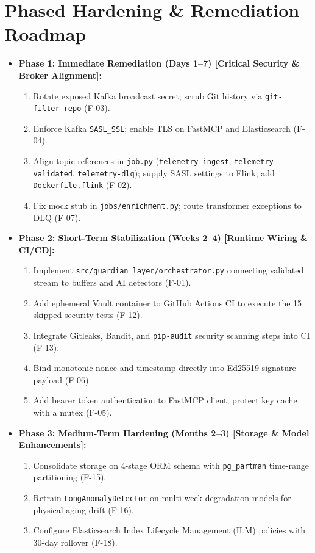 \documentclass[10pt,a4paper]{report}
\begin{document}
\section{Phased Hardening \& Remediation Roadmap}
\begin{itemize}[leftmargin=*]
  \item \textbf{Phase 1: Immediate Remediation (Days 1--7) [Critical Security \& Broker Alignment]:}
  \begin{enumerate}
    \item Rotate exposed Kafka broadcast secret; scrub Git history via \texttt{git-filter-repo} (F-03).
    \item Enforce Kafka \texttt{SASL\_SSL}; enable TLS on FastMCP and Elasticsearch (F-04).
    \item Align topic references in \texttt{job.py} (\texttt{telemetry-ingest}, \texttt{telemetry-validated}, \texttt{telemetry-dlq}); supply SASL settings to Flink; add \texttt{Dockerfile.flink} (F-02).
    \item Fix mock stub in \texttt{jobs/enrichment.py}; route transformer exceptions to DLQ (F-07).
  \end{enumerate}
  \item \textbf{Phase 2: Short-Term Stabilization (Weeks 2--4) [Runtime Wiring \& CI/CD]:}
  \begin{enumerate}
    \item Implement \texttt{src/guardian\_layer/orchestrator.py} connecting validated stream to buffers and AI detectors (F-01).
    \item Add ephemeral Vault container to GitHub Actions CI to execute the 15 skipped security tests (F-12).
    \item Integrate Gitleaks, Bandit, and \texttt{pip-audit} security scanning steps into CI (F-13).
    \item Bind monotonic nonce and timestamp directly into Ed25519 signature payload (F-06).
    \item Add bearer token authentication to FastMCP client; protect key cache with a mutex (F-05).
  \end{enumerate}
  \item \textbf{Phase 3: Medium-Term Hardening (Months 2--3) [Storage \& Model Enhancements]:}
  \begin{enumerate}
    \item Consolidate storage on 4-stage ORM schema with \texttt{pg\_partman} time-range partitioning (F-15).
    \item Retrain \texttt{LongAnomalyDetector} on multi-week degradation models for physical aging drift (F-16).
    \item Configure Elasticsearch Index Lifecycle Management (ILM) policies with 30-day rollover (F-18).
  \end{enumerate}
\end{itemize}
\end{document}
